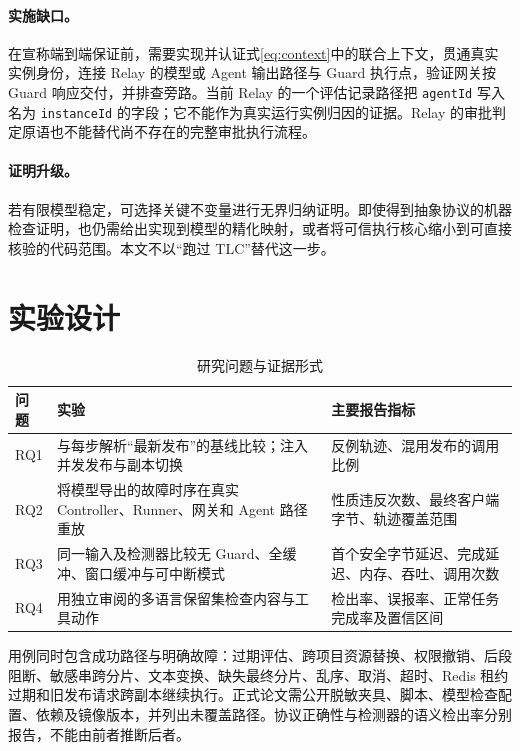 \documentclass[11pt,a4paper]{article}
\theoremstyle{definition}
\newcommand{\code}[1]{\texttt{#1}}
\begin{document}
\paragraph{实施缺口。} 在宣称端到端保证前，需要实现并认证式\eqref{eq:context}中的联合上下文，贯通真实实例身份，连接 Relay 的模型或 Agent 输出路径与 Guard 执行点，验证网关按 Guard 响应交付，并排查旁路。当前 Relay 的一个评估记录路径把 \code{agentId} 写入名为 \code{instanceId} 的字段；它不能作为真实运行实例归因的证据\cite{relayrepo}。Relay 的审批判定原语也不能替代尚不存在的完整审批执行流程。

\paragraph{证明升级。} 若有限模型稳定，可选择关键不变量进行无界归纳证明。即使得到抽象协议的机器检查证明，也仍需给出实现到模型的精化映射，或者将可信执行核心缩小到可直接核验的代码范围。本文不以“跑过 TLC”替代这一步。

\section{实验设计}

\begin{table}[htbp]
\centering
\small
\caption{研究问题与证据形式}\label{tab:evaluation}
\begin{tabularx}{\textwidth}{>{\raggedright\arraybackslash}p{16mm} >{\raggedright\arraybackslash}X >{\raggedright\arraybackslash}X}
\toprule
问题 & 实验 & 主要报告指标 \\
\midrule
RQ1 & 与每步解析“最新发布”的基线比较；注入并发发布与副本切换 & 反例轨迹、混用发布的调用比例 \\
RQ2 & 将模型导出的故障时序在真实 Controller、Runner、网关和 Agent 路径重放 & 性质违反次数、最终客户端字节、轨迹覆盖范围 \\
RQ3 & 同一输入及检测器比较无 Guard、全缓冲、窗口缓冲与可中断模式 & 首个安全字节延迟、完成延迟、内存、吞吐、调用次数 \\
RQ4 & 用独立审阅的多语言保留集检查内容与工具动作 & 检出率、误报率、正常任务完成率及置信区间 \\
\bottomrule
\end{tabularx}
\end{table}

用例同时包含成功路径与明确故障：过期评估、跨项目资源替换、权限撤销、后段阻断、敏感串跨分片、文本变换、缺失最终分片、乱序、取消、超时、Redis 租约过期和旧发布请求跨副本继续执行。正式论文需公开脱敏夹具、脚本、模型检查配置、依赖及镜像版本，并列出未覆盖路径。协议正确性与检测器的语义检出率分别报告，不能由前者推断后者。
\end{document}

